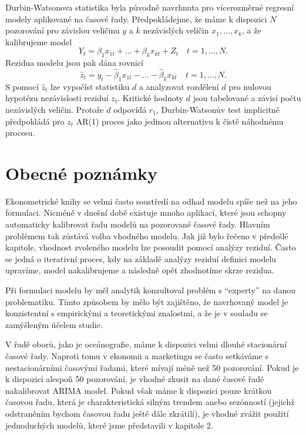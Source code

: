 Durbin-Watsonova statistika byla původně navrhnuta pro vícerozměrné regresní modely aplikované na časové řady. Předpokládejme, že máme k dispozici $N$ pozorování pro závislou veličinu $y$ a $k$ nezávislých veličin $x_1, ..., x_k$, a že kalibrujeme model
\begin{equation}
Y_t = \beta_1 x_{1t} + ... + \beta_k x_{kt} + Z_t \quad t = 1, ..., N.
\end{equation}
Rezidua modelu jsou pak dána rovnicí
\begin{equation}
\hat{z}_t = y_t - \hat{\beta}_1 x_{1t} - ... - \hat{\beta}_k x_{kt} \quad t = 1, ..., N.
\end{equation}
S pomocí $\hat{z}_t$ lze vypočíst statistiku $d$ a analyzovat rozdělení $d$ pro nulovou hypotézu nezávislosti reziduí $z_t$. Kritické hodnoty $d$ jsou tabelované a závisí počtu nezávislých veličin. Protože $d$ odpovídá $r_1$, Durbin-Watsonův test implicitně předpokládá pro $z_t$ AR(1) proces jako jedinou alternativu k čistě náhodnému procesu.

\section{Obecné poznámky}

Ekonometrické knihy se velmi často soustředí na odhad modelu spíše než na jeho formulaci. Nicméně v dnešní době existuje mnoho aplikací, které jsou schopny automaticky kalibrovat řadu modelů na pozorované časové řady. Hlavním problémem tak zůstává volba vhodného modelu. Jak již bylo řečeno v předešlé kapitole, vhodnost zvoleného modelu lze posoudit pomocí analýzy reziduí. Často se jedná o iterativní proces, kdy na základě analýzy reziduí definici modelu upravíme, model nakalibrujeme a následně opět zhodnotíme skrze rezidua.

Při formulaci modelu by měl analytik konzultoval problém s ``experty'' na danou problematiku. Tímto způsobem by mělo být zajištěno, že navrhovaný model je konzistentní s empirickými a teoretickými znalostmi, a že je v souladu se zamýšleným účelem studie.

V řadě oborů, jako je oceánografie, máme k dispozici velmi dlouhé stacionární časové řady. Naproti tomu v ekonomii a marketingu se často setkáváme s nestacionárními časovými řadami, které mívají méně než 50 pozorování. Pokud je k dispozici alespoň 50 pozorování, je vhodné zkusit na dané časové řadě nakalibrovat ARIMA model. Pokud však máme k dispozici pouze krátkou časovou řadu, která je charakteristická silným trendem anebo sezónností (jejichž odstraněním bychom časovou řadu ještě dále zkrátili), je vhodné zvážit použití jednoduchých modelů, které jsme představili v kapitole 2.

 